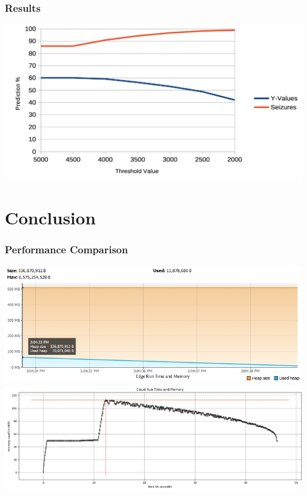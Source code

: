 \documentclass[xelatex,usenames,dvipsnames]{beamer}
\begin{document}
  \begin{frame}[standout]
    \frametitle{Results}
  
    \includegraphics[width = \textwidth]{figs/Threshold.png}
    
  
  \end{frame}


  \section{Conclusion}
  \begin{frame}[standout]
    \frametitle{Performance Comparison}
    
    \includegraphics[width = \textwidth]{figs/Edgent_Run_Time_Memory.png}
    \includegraphics[width = \textwidth]{figs/Cloud_Run_Time_Memory.png}
    
  
  \end{frame}
\end{document}
